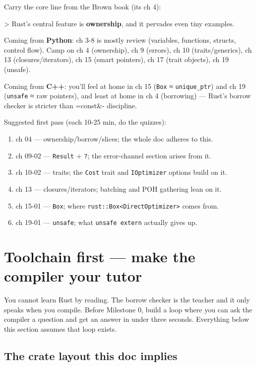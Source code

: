 \documentclass[11pt]{article}
\begin{document}
Carry the core line from the Brown book (its ch 4):

> Rust's central feature is \textbf{ownership}, and it pervades even tiny examples.

Coming from \textbf{\textbf{Python}}: ch 3-8 is mostly review (variables, functions,
structs, control flow). Camp on ch 4 (ownership), ch 9 (errors),
ch 10 (traits/generics), ch 13 (closures/iterators), ch 15 (smart pointers),
ch 17 (trait objects), ch 19 (unsafe).

Coming from \textbf{\textbf{C++}}: you'll feel at home in ch 15 (\texttt{Box} ≈ \texttt{unique\_ptr}) and
ch 19 (\texttt{unsafe} ≈ raw pointers), and least at home in ch 4 (borrowing) —
Rust's borrow checker is stricter than =const\&- discipline.

Suggested first pass (each 10-25 min, do the quizzes):

\begin{enumerate}
\item ch 04 — ownership/borrow/slices; the whole doc adheres to this.
\item ch 09-02 — \texttt{Result} + \texttt{?}; the error-channel section arises from it.
\item ch 10-02 — traits; the \texttt{Cost} trait and \texttt{IOptimizer} options build on it.
\item ch 13 — closures/iterators; batching and POH gathering lean on it.
\item ch 15-01 — \texttt{Box}; where \texttt{rust::Box<DirectOptimizer>} comes from.
\item ch 19-01 — \texttt{unsafe}; what \texttt{unsafe extern} actually gives up.
\end{enumerate}
\section{Toolchain first — make the compiler your tutor}
\label{sec:org55a873f}

You cannot learn Rust by reading. The borrow checker is the teacher and it only
speaks when you compile. Before Milestone 0, build a loop where you can ask the
compiler a question and get an answer in under three seconds. Everything below
this section assumes that loop exists.
\subsection{The crate layout this doc implies}
\label{sec:org8e4a061}
\end{document}
